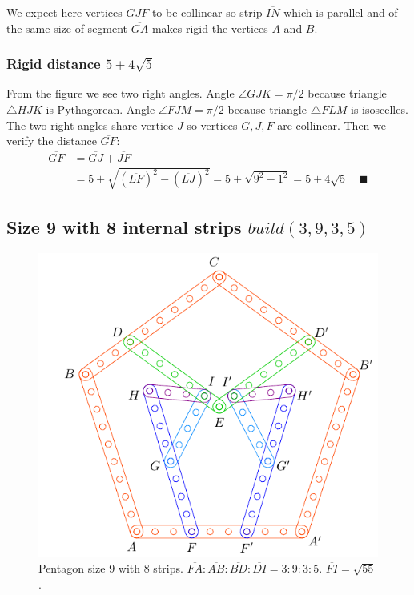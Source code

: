 \documentclass[11pt]{article}
\begin{document}
We expect here vertices $GJF$ to be collinear so strip $\overline{IN}$ which is parallel and of the same size of segment $\overline{GA}$ makes rigid the vertices $A$ and $B$.

\subsubsection{Rigid distance $5 + 4\sqrt5$}

From the figure we see two right angles. Angle $\angle{GJK} = \pi/2$ because triangle $\triangle{HJK}$  is Pythagorean. Angle $\angle{FJM} = \pi/2$ because triangle $\triangle{FLM}$ is isoscelles. The two right angles share vertice $J$ so vertices $G,J,F$ are collinear. Then we verify the distance $\overline{GF}$:
\begin{align}
\overline{GF} &= \overline{GJ} + \overline{JF} \nonumber\\
 &= 5 + \sqrt{(\overline{LF})^2 - (\overline{LJ})^2} 
 = 5 + \sqrt{9^2-1^2} = 5 + 4\sqrt5 \quad \blacksquare
\end{align}

\subsection{Size 9 with 8 internal strips $build(3,9,3,5)$}

\begin{figure}[h]
 \centering
 \includegraphics[scale=0.95]{9/penta9-8a}
 \caption{Pentagon size 9 with 8 strips. $\overline{FA}:\overline{AB}:\overline{BD}:\overline{DI} = 3:9:3:5$. $\overline{FI} = \sqrt{55}$.}
 \label{fig:penta9-8a}
\end{figure}
\end{document}
